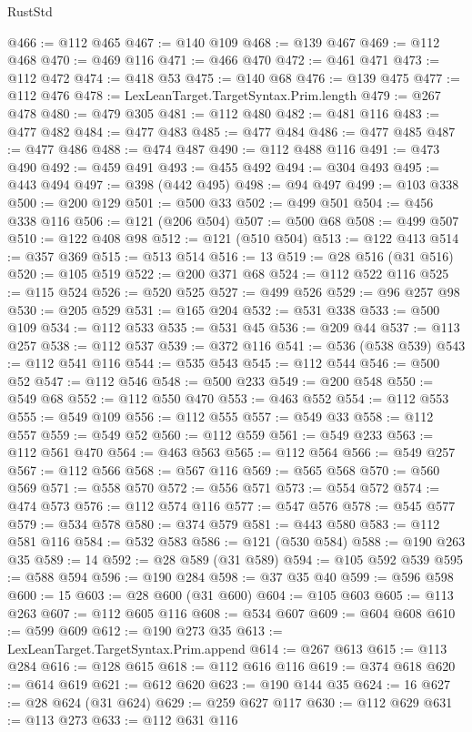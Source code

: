 \begin{lexlean}{RustStd}
\begin{coremodule}
{\begin{coremodule}
{{{{{{{{{{{{{{{{{{{{{{{{{{{{{{{{{{{{{{{{{{{{@466 := @112 @465
@467 := @140 @109
@468 := @139 @467
@469 := @112 @468
@470 := @469 @116
@471 := @466 @470
@472 := @461 @471
@473 := @112 @472
@474 := @418 @53
@475 := @140 @68
@476 := @139 @475
@477 := @112 @476
@478 := LexLeanTarget.TargetSyntax.Prim.length
@479 := @267 @478
@480 := @479 @305
@481 := @112 @480
@482 := @481 @116
@483 := @477 @482
@484 := @477 @483
@485 := @477 @484
@486 := @477 @485
@487 := @477 @486
@488 := @474 @487
@490 := @112 @488 @116
@491 := @473 @490
@492 := @459 @491
@493 := @455 @492
@494 := @304 @493
@495 := @443 @494
@497 := @398 (@442 @495)
@498 := @94 @497
@499 := @103 @338
@500 := @200 @129
@501 := @500 @33
@502 := @499 @501
@504 := @456 @338 @116
@506 := @121 (@206 @504)
@507 := @500 @68
@508 := @499 @507
@510 := @122 @408 @98
@512 := @121 (@510 @504)
@513 := @122 @413
@514 := @357 @369
@515 := @513 @514
@516 := 13
@519 := @28 @516 (@31 @516)
@520 := @105 @519
@522 := @200 @371 @68
@524 := @112 @522 @116
@525 := @115 @524
@526 := @520 @525
@527 := @499 @526
@529 := @96 @257 @98
@530 := @205 @529
@531 := @165 @204
@532 := @531 @338
@533 := @500 @109
@534 := @112 @533
@535 := @531 @45
@536 := @209 @44
@537 := @113 @257
@538 := @112 @537
@539 := @372 @116
@541 := @536 (@538 @539)
@543 := @112 @541 @116
@544 := @535 @543
@545 := @112 @544
@546 := @500 @52
@547 := @112 @546
@548 := @500 @233
@549 := @200 @548
@550 := @549 @68
@552 := @112 @550 @470
@553 := @463 @552
@554 := @112 @553
@555 := @549 @109
@556 := @112 @555
@557 := @549 @33
@558 := @112 @557
@559 := @549 @52
@560 := @112 @559
@561 := @549 @233
@563 := @112 @561 @470
@564 := @463 @563
@565 := @112 @564
@566 := @549 @257
@567 := @112 @566
@568 := @567 @116
@569 := @565 @568
@570 := @560 @569
@571 := @558 @570
@572 := @556 @571
@573 := @554 @572
@574 := @474 @573
@576 := @112 @574 @116
@577 := @547 @576
@578 := @545 @577
@579 := @534 @578
@580 := @374 @579
@581 := @443 @580
@583 := @112 @581 @116
@584 := @532 @583
@586 := @121 (@530 @584)
@588 := @190 @263 @35
@589 := 14
@592 := @28 @589 (@31 @589)
@594 := @105 @592 @539
@595 := @588 @594
@596 := @190 @284
@598 := @37 @35 @40
@599 := @596 @598
@600 := 15
@603 := @28 @600 (@31 @600)
@604 := @105 @603
@605 := @113 @263
@607 := @112 @605 @116
@608 := @534 @607
@609 := @604 @608
@610 := @599 @609
@612 := @190 @273 @35
@613 := LexLeanTarget.TargetSyntax.Prim.append
@614 := @267 @613
@615 := @113 @284
@616 := @128 @615
@618 := @112 @616 @116
@619 := @374 @618
@620 := @614 @619
@621 := @612 @620
@623 := @190 @144 @35
@624 := 16
@627 := @28 @624 (@31 @624)
@629 := @259 @627 @117
@630 := @112 @629
@631 := @113 @273
@633 := @112 @631 @116
}}}}}}}}}}}}}}}}}}}}}}}}}}}}}}}}}}}}}}}}}}}}
\end{coremodule}}
\end{coremodule}
\end{lexlean}
